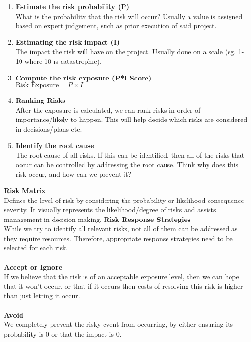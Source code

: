 \documentclass[a4paper,10pt]{article}
\begin{document}
\begin{enumerate}
	\item \textbf{Estimate the risk probability (P)}\\
	What is the probability that the risk will occur? Usually a value is assigned based on expert judgement, such as prior execution of said project.
	\item \textbf{Estimating the risk impact (I)} \\
	The impact the risk will have on the project. Usually done on a scale (eg. 1-10 where 10 is catastrophic).  
	\item \textbf{Compute the risk exposure (P*I Score)} \\
	$\text{Risk Exposure} = P \times I$
	\item \textbf{Ranking Risks}\\
	After the exposure is calculated, we can rank risks in order of importance/likely to happen. This will help decide which risks are considered in decisions/plans etc. 
	\item \textbf{Identify the root cause} \\
	The root cause of all risks. If this can be identified, then all of the risks that occur can be controlled by addressing the root cause. Think why does this risk occur, and how can we prevent it? 
\end{enumerate}
\textcolor{BlueGreen}{\textbf{Risk Matrix}} \\
Defines the level of risk by considering the probability or likelihood consequence severity. It visually represents the likelihood/degree of risks and assists management in decision making. 
\textcolor{BlueGreen}{\textbf{Risk Response Strategies}} \\
While we try to identify all relevant risks, not all of them can be addressed as they require resources. Therefore, appropriate response strategies need to be selected for each risk. \\\\
\textbf{Accept or Ignore} \\
If we believe that the risk is of an acceptable exposure level, then we can hope that it won't occur, or that if it occurs then costs of resolving this risk is higher than just letting it occur. \\\\
\textbf{Avoid} \\
We completely prevent the risky event from occurring, by either ensuring its probability is 0 or that the impact is 0. \\\\
\end{document}
